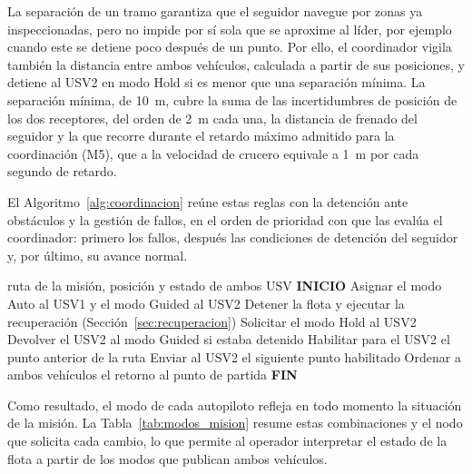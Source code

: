 La separación de un tramo garantiza que el seguidor navegue por zonas ya inspeccionadas, pero no impide por sí 
sola que se aproxime al líder, por ejemplo cuando este se detiene poco después de un punto. Por ello, el 
coordinador vigila también la distancia entre ambos vehículos, calculada a partir de sus posiciones, y detiene 
al USV2 en modo Hold si es menor que una separación mínima. La separación mínima, de 10~m, cubre la suma de las 
incertidumbres de posición de los dos receptores, del orden de 2~m cada una, la distancia de frenado del seguidor 
y la que recorre durante el retardo máximo admitido para la coordinación (M5), que a la velocidad de crucero 
equivale a 1~m por cada segundo de retardo.

El Algoritmo~\ref{alg:coordinacion} reúne estas reglas con la detención ante obstáculos y la gestión de fallos, 
en el orden de prioridad con que las evalúa el coordinador: primero los fallos, después las condiciones de 
detención del seguidor y, por último, su avance normal.

\begin{algorithm}[!htb]
\caption{Coordinación de la flota en la estación base.}
\label{alg:coordinacion}
\begin{algorithmic}[1]
\Require ruta de la misión, posición y estado de ambos USV
\Statex \textbf{INICIO}
\State Asignar el modo Auto al USV1 y el modo Guided al USV2
        \State Detener la flota y ejecutar la recuperación (Sección~\ref{sec:recuperacion})
        \State Solicitar el modo Hold al USV2
    \Else
        \State Devolver el USV2 al modo Guided si estaba detenido
            \State Habilitar para el USV2 el punto anterior de la ruta
        \EndIf
            \State Enviar al USV2 el siguiente punto habilitado
        \EndIf
    \EndIf
\EndWhile
\State Ordenar a ambos vehículos el retorno al punto de partida
\Statex \textbf{FIN}
\end{algorithmic}
\end{algorithm}

Como resultado, el modo de cada autopiloto refleja en todo momento la situación de la misión. La 
Tabla~\ref{tab:modos_mision} resume estas combinaciones y el nodo que solicita cada cambio, lo que permite al 
operador interpretar el estado de la flota a partir de los modos que publican ambos vehículos.

